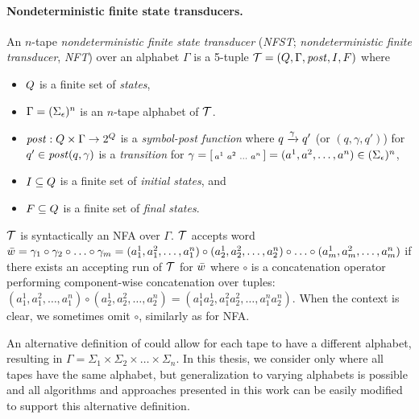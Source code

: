\paragraph{Nondeterministic finite state transducers.}
An $n$-tape \emph{nondeterministic finite state transducer} (\emph{NFST}; \emph{nondeterministic finite transducer}, \emph{NFT}) over an alphabet $\Gamma$ is a 5-tuple $\mathcal{T} = (Q, \Gamma, \mathit{post}, I, F)$ where
\begin{itemize}
    \item $Q$ is a finite set of \emph{states},
    \item $\Gamma = (\Sigma_\epsilon)^n$ is an $n$-tape alphabet of $\mathcal{T}$.
    \item $\mathit{post}: Q \times \Gamma \rightarrow 2^{Q}$ is a \emph{symbol-post function}
    where ${q} \xrightarrow{{\gamma}} {q'}$ (or $(q, \gamma, q')$) for $q' \in \mathit{post}(q, \gamma)$ is a \emph{transition} for $\gamma = \begin{bsmallmatrix} a^1 & a^2 & \ldots & a^n\end{bsmallmatrix} = (a^1, a^2, \ldots, a^n) \in (\Sigma_\epsilon)^n$,
    \item $I \subseteq Q$ is a finite set of \emph{initial states}, and
    \item $F \subseteq Q$ is a finite set of \emph{final states}.
\end{itemize}

\nft $\mathcal{T}$ is syntactically an NFA over $\Gamma$.
$\mathcal{T}$ accepts word $\bar{{w}} = \gamma_1 \circ \gamma_2 \circ \ldots \circ \gamma_m = (a^1_1, a^2_1, \ldots, a^n_1) \circ (a^1_2, a^2_2, \ldots, a^n_2) \circ \ldots \circ (a^1_m, a^2_m, \ldots, a^n_m) $
 if there exists an accepting run of $\mathcal{T}$ for $\bar{{w}}$ where $\circ$ is a concatenation operator performing component-wise concatenation over tuples:
$(a^1_1, a^2_1, \ldots, a^n_1) \circ (a^1_2, a^2_2, \ldots, a^n_2) = (a^1_1a^1_2, a^2_1a^2_2, \ldots, a^n_1a^n_2)$.
When the context is clear, we sometimes omit $\circ$, similarly as for NFA.

An alternative definition of \nfts could allow for each tape to have a different alphabet, resulting in $\Gamma = \Sigma_1 \times \Sigma_2 \times \ldots \times \Sigma_n$.
In this thesis, we consider only \nfts where all tapes have the same alphabet, but generalization to varying alphabets is possible and all algorithms and approaches presented in this work can be easily modified to support this alternative definition.

